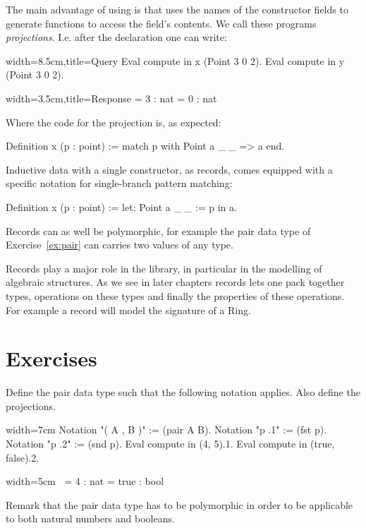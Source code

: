 The main advantage of using  is that \Coq{} uses the names of the
constructor fields to generate functions to access the field's contents.  We
call these programs \emph{projections}.  I.e. after the  declaration
one can write:

\begin{coq}{}{width=8.5cm,title=Query}
Eval compute in x (Point 3 0 2).
Eval compute in y (Point 3 0 2).
\end{coq}{}{}
\begin{coqout}{}{width=3.5cm,title=Response}
= 3 : nat
= 0 : nat
\end{coqout}{}{}
Where the code for the  projection is, as expected:

\begin{coq}{}{}
Definition x (p : point) := match p with Point a _ _ => a end.
\end{coq}
Inductive data with a single constructor, as records, comes
equipped with a specific notation for single-branch pattern
matching:

\begin{coq}{}{}
Definition x (p : point) := let: Point a _ _ := p in a.
\end{coq}

Records can as well be polymorphic, for example the pair data type of
Exercise~\ref{ex:pair} can carries two values of any type.

Records play a major role in the \mcbMC{} library, in particular
in the modelling of algebraic structures.   As we see in later chapters
records lets one pack together types, operations on these types and
finally the properties of these operations.  For example a record
will model the signature of a Ring.

\newpage
\section{Exercises}

\begin{Exercise}[label=ex:pair,difficulty=0,title={The pair data type}]
Define the pair data type such that the following notation
applies.  Also define the projections.

\begin{coq}{}{width=7cm}
Notation "( A , B )" := (pair A B).
Notation "p .1" := (fst p).
Notation "p .2" := (snd p).
Eval compute in (4, 5).1.
Eval compute in (true, false).2.
\end{coq}
\begin{coqout}{}{width=5cm}
$~$
     = 4 : nat
     = true : bool
\end{coqout}
Remark that the pair data type has to be polymorphic in order to
be applicable to both natural numbers and booleans.
\end{Exercise}

